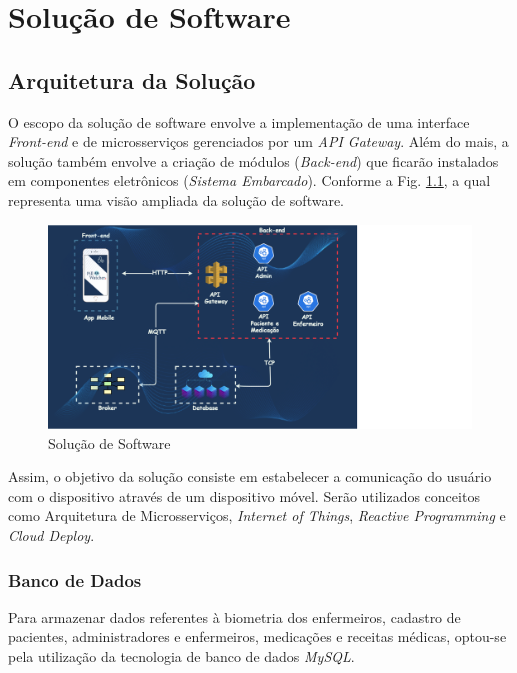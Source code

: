\chapter[Solução de Software]{Solução de Software}
\section{Arquitetura da Solução}

O escopo da solução de software envolve a implementação de uma interface \emph{Front-end} e de microsserviços gerenciados por um \emph{API Gateway}. Além do mais, a solução também envolve a criação de módulos (\textit{Back-end}) que ficarão instalados em componentes eletrônicos (\emph{Sistema Embarcado}). Conforme a Fig. \ref{fig:software_solution}, a qual representa uma visão ampliada da solução de software.

\begin{figure}[H]
    \centering
    \includegraphics[width=\textwidth]{figuras/software/solucao_software.png}
    \caption{Solução de Software}
    \label{fig:software_solution}
\end{figure}

Assim, o objetivo da solução consiste em estabelecer a comunicação do usuário com o dispositivo através de um dispositivo móvel. Serão utilizados conceitos como Arquitetura de Microsserviços, \emph{Internet of Things}, \emph{Reactive Programming} e \emph{Cloud Deploy}.

\subsection{Banco de Dados}

Para armazenar dados referentes à biometria dos enfermeiros, cadastro de pacientes, administradores e enfermeiros, medicações e receitas médicas, optou-se pela utilização da tecnologia de banco de dados \emph{MySQL}. 

